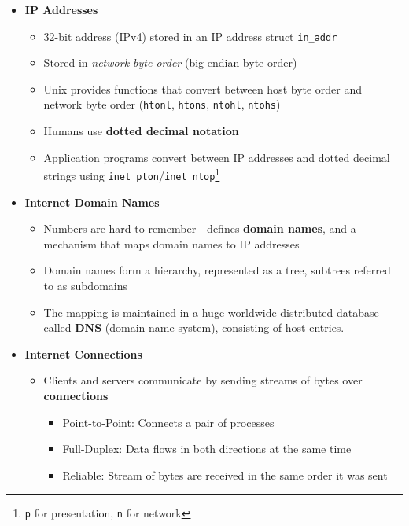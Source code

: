 \documentclass[12pt]{article}
\begin{document}
{\begin{itemize}
\begin{itemize}
		\item Hosts are mapped to a set of 32-bit \textbf{IP addresses}
		\item Each IP address is mapped to an identifier called Internet \textbf{domain names}
		\item A process on one Internet host can communicate with a process on another Internet host over a \textbf{connection}
	\end{itemize}
	\item \textbf{IP Addresses}
	\begin{itemize}
		\item 32-bit address (IPv4) stored in an IP address struct \texttt{in\_addr}
		\item Stored in \textit{network byte order} (big-endian byte order)
		\item Unix provides functions that convert between host byte order and network byte order (\texttt{htonl}, \texttt{htons}, \texttt{ntohl}, \texttt{ntohs})
		\item Humans use \textbf{dotted decimal notation}
		\item Application programs convert between IP addresses and dotted decimal strings using \texttt{inet\_pton}/\texttt{inet\_ntop}\footnote{\texttt{p} for presentation, \texttt{n} for network}
	\end{itemize}
	\item \textbf{Internet Domain Names}
	\begin{itemize}
		\item Numbers are hard to remember - defines \textbf{domain names}, and a mechanism that maps domain names to IP addresses
		\item Domain names form a hierarchy, represented as a tree, subtrees referred to as subdomains
		\item The mapping is maintained in a huge worldwide distributed database called \textbf{DNS} (domain name system), consisting of host entries.
	\end{itemize}
	\item \textbf{Internet Connections}
	\begin{itemize}
		\item Clients and servers communicate by sending streams of bytes over \textbf{connections}
		\begin{itemize}
			\item Point-to-Point: Connects a pair of processes
			\item Full-Duplex: Data flows in both directions at the same time
			\item Reliable: Stream of bytes are received in the same order it was sent

\end{itemize}
\end{itemize}
\end{itemize}}
\end{document}
